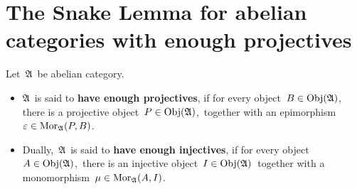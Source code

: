 

\section{The Snake Lemma for abelian categories with enough projectives}
\setcounter{theorem}{0}
\setcounter{equation}{0}


\renewcommand{\theenumi}{\roman{enumi}}
\renewcommand{\labelenumi}{\textnormal{(\theenumi)}$\;\;$}


\begin{definition}
\mbox{}
\vskip 0.1cm
\noindent
Let \,$\mathfrak{A}$\, be abelian category.
\begin{itemize}
\item
	$\mathfrak{A}$\, is said to \textbf{have enough projectives},
	if for every object \,$B \in \textnormal{Obj}(\mathfrak{A})$,\,
	there is a projective object \,$P \in \textnormal{Obj}(\mathfrak{A})$,\,
	together with an epimorphism \,$\varepsilon \in \textnormal{Mor}_{\mathfrak{A}}(P,B)$.
\item	
	Dually, \,$\mathfrak{A}$\, is said to \textbf{have enough injectives},
	if for every object \,$A \in \textnormal{Obj}(\mathfrak{A})$,\,
	there is an injective object \,$I \in \textnormal{Obj}(\mathfrak{A})$\,
	together with a monomorphism \,$\mu \in \textnormal{Mor}_{\mathfrak{A}}(A,I)$.
\end{itemize}
\end{definition}

\vskip 0.5cm


